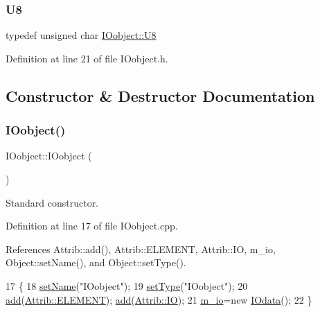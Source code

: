 \subsubsection{\texorpdfstring{U8}{U8}}
{\footnotesize\ttfamily typedef unsigned char \hyperlink{classIOobject_a14ca3894cb3b023d2a0b2d088fddfc90}{I\+Oobject\+::\+U8}}



Definition at line 21 of file I\+Oobject.\+h.



\subsection{Constructor \& Destructor Documentation}
\mbox{\label{classIOobject_a0c3f5a9fcc09892e99a4c977f4318a0b}} 
\subsubsection{\texorpdfstring{I\+Oobject()}{IOobject()}}
{\footnotesize\ttfamily I\+Oobject\+::\+I\+Oobject (\begin{DoxyParamCaption}{ }\end{DoxyParamCaption})}



Standard constructor. 



Definition at line 17 of file I\+Oobject.\+cpp.



References Attrib\+::add(), Attrib\+::\+E\+L\+E\+M\+E\+NT, Attrib\+::\+IO, m\+\_\+io, Object\+::set\+Name(), and Object\+::set\+Type().


\begin{DoxyCode}
17                      \{
18   \hyperlink{classObject_ae30fea75683c2d149b6b6d17c09ecd0c}{setName}(\textcolor{stringliteral}{"IOobject"});
19   \hyperlink{classObject_aae534cc9d982bcb9b99fd505f2e103a5}{setType}(\textcolor{stringliteral}{"IOobject"});
20   \hyperlink{classAttrib_a235f773af19c900264a190b00a3b4ad7}{add}(\hyperlink{classAttrib_a69e171d7cc6417835a5a306d3c764235a7788bc5dd333fd8ce18562b269c9dab1}{Attrib::ELEMENT});  \hyperlink{classAttrib_a235f773af19c900264a190b00a3b4ad7}{add}(\hyperlink{classAttrib_a69e171d7cc6417835a5a306d3c764235a1420a5b8c0540b2af210b6975eded7f9}{Attrib::IO});
21   \hyperlink{classIOobject_aa648e4128c3c37d8291d6bb26b57c504}{m\_io}=\textcolor{keyword}{new} \hyperlink{classIOdata}{IOdata}();
22 \}
\end{DoxyCode}
\mbox{\label{classIOobject_a1db3f3f5d07a00a0b4cd47b2a0222f84}} 
